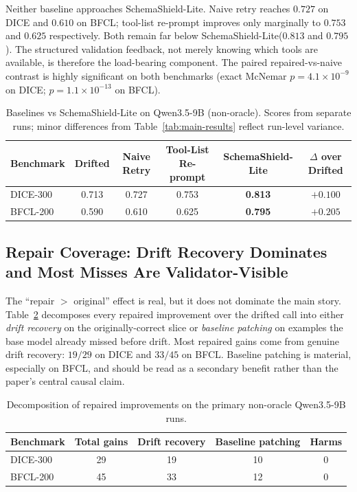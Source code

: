 \documentclass[runningheads]{llncs}
\newcommand{\method}{SchemaShield-Lite\xspace}
\begin{document}
Neither baseline approaches \method. Naive retry reaches $0.727$ on DICE and
$0.610$ on BFCL; tool-list re-prompt improves only marginally to $0.753$ and
$0.625$ respectively. Both remain far below \method ($0.813$ and $0.795$).
The structured validation feedback, not merely knowing which tools are
available, is therefore the load-bearing component. The paired
repaired-vs-naive contrast is highly significant on both benchmarks
(exact McNemar $p=4.1\times 10^{-9}$ on DICE; $p=1.1\times 10^{-13}$ on BFCL).

\begin{table}[t]
\caption{Baselines vs \method on Qwen3.5-9B (non-oracle). Scores from separate
runs; minor differences from Table~\ref{tab:main-results} reflect run-level variance.}
\label{tab:naive-retry}
\centering
\small
\begin{tabular}{lccccc}
\toprule
Benchmark & Drifted & Naive Retry & Tool-List Re-prompt & \method & $\Delta$ over Drifted \\
\midrule
DICE-300   & 0.713 & 0.727 & 0.753 & \textbf{0.813} & $+0.100$ \\
BFCL-200   & 0.590 & 0.610 & 0.625 & \textbf{0.795} & $+0.205$ \\
\bottomrule
\end{tabular}
\end{table}

\subsection{Repair Coverage: Drift Recovery Dominates and Most Misses Are Validator-Visible}
\label{sec:repair-coverage}
The ``repair $>$ original'' effect is real, but it does not dominate the main
story. Table~\ref{tab:gain-decomposition} decomposes every repaired improvement over
the drifted call into either \emph{drift recovery} on the originally-correct slice
or \emph{baseline patching} on examples the base model already missed before drift.
Most repaired gains come from genuine drift recovery: $19/29$ on DICE and
$33/45$ on BFCL. Baseline patching is material, especially on BFCL, and should be
read as a secondary benefit rather than the paper's central causal claim.

\begin{table}[t]
\caption{Decomposition of repaired improvements on the primary non-oracle
Qwen3.5-9B runs.}
\label{tab:gain-decomposition}
\centering
\small
\begin{tabular}{lcccc}
\toprule
Benchmark & Total gains & Drift recovery & Baseline patching & Harms \\
\midrule
DICE-300 & 29 & 19 & 10 & 0 \\
BFCL-200 & 45 & 33 & 12 & 0 \\
\bottomrule
\end{tabular}
\end{table}
\end{document}
